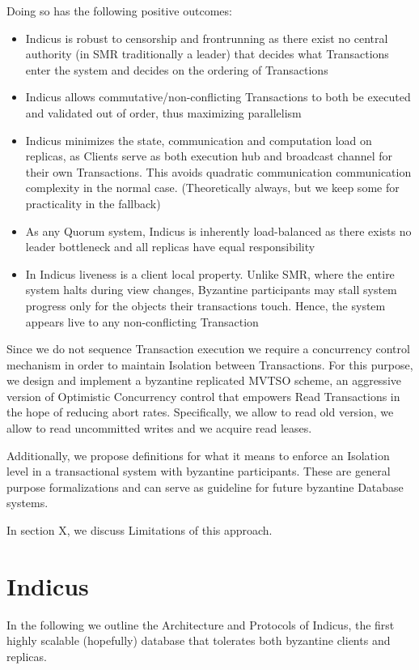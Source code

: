Doing so has the following positive outcomes:
\begin{itemize}

\item Indicus is robust to censorship and frontrunning as there exist no central authority (in SMR traditionally a leader) that decides what Transactions enter the system and decides on the ordering of Transactions
\item Indicus allows commutative/non-conflicting Transactions to both be executed and validated out of order, thus maximizing parallelism
\item Indicus minimizes the state, communication and computation load on replicas, as Clients serve as both execution hub and broadcast channel for their own Transactions. This avoids quadratic communication communication complexity in the normal case. (Theoretically always, but we keep some for practicality in the fallback)
\item As any Quorum system, Indicus is inherently load-balanced as there exists no leader bottleneck and all replicas have equal responsibility
\item In Indicus liveness is a client local property. Unlike SMR, where the entire system halts during view changes, Byzantine participants may stall system progress only for the objects their transactions touch. Hence, the system appears live to any non-conflicting Transaction
\end{itemize}

Since we do not sequence Transaction execution we require a concurrency control mechanism in order to maintain Isolation between Transactions.
For this purpose, we design and implement a byzantine replicated MVTSO scheme, an aggressive version of Optimistic Concurrency control that empowers Read Transactions in the hope of reducing abort rates. Specifically, we allow to read old version, we allow to read uncommitted writes and we acquire read leases.

Additionally, we propose definitions for what it means to enforce an Isolation level in a transactional system with byzantine participants. These are general purpose formalizations and can serve as guideline for future byzantine Database systems.

In section X, we discuss Limitations of this approach. 



\section{Indicus}
In the following we outline the Architecture and Protocols of Indicus, the first highly scalable (hopefully) database that tolerates both byzantine clients and replicas.
